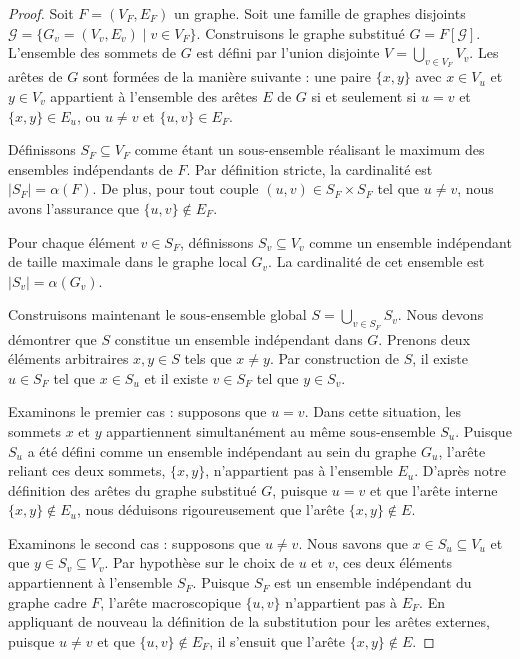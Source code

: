 \documentclass[11pt, a4paper]{article}
\begin{document}
\begin{proof}
Soit $F = (V_F, E_F)$ un graphe. Soit une famille de graphes disjoints $\mathcal{G} = \{G_v = (V_v, E_v) \mid v \in V_F\}$.
Construisons le graphe substitué $G = F[\mathcal{G}]$. L'ensemble des sommets de $G$ est défini par l'union disjointe $V = \bigcup_{v \in V_F} V_v$.
Les arêtes de $G$ sont formées de la manière suivante : une paire $\{x, y\}$ avec $x \in V_u$ et $y \in V_v$ appartient à l'ensemble des arêtes $E$ de $G$ si et seulement si $u = v$ et $\{x, y\} \in E_u$, ou $u \neq v$ et $\{u, v\} \in E_F$.

Définissons $S_F \subseteq V_F$ comme étant un sous-ensemble réalisant le maximum des ensembles indépendants de $F$.
Par définition stricte, la cardinalité est $|S_F| = \alpha(F)$. De plus, pour tout couple $(u, v) \in S_F \times S_F$ tel que $u \neq v$, nous avons l'assurance que $\{u, v\} \notin E_F$.

Pour chaque élément $v \in S_F$, définissons $S_v \subseteq V_v$ comme un ensemble indépendant de taille maximale dans le graphe local $G_v$.
La cardinalité de cet ensemble est $|S_v| = \alpha(G_v)$.

Construisons maintenant le sous-ensemble global $S = \bigcup_{v \in S_F} S_v$.
Nous devons démontrer que $S$ constitue un ensemble indépendant dans $G$.
Prenons deux éléments arbitraires $x, y \in S$ tels que $x \neq y$.
Par construction de $S$, il existe $u \in S_F$ tel que $x \in S_u$ et il existe $v \in S_F$ tel que $y \in S_v$.

Examinons le premier cas : supposons que $u = v$.
Dans cette situation, les sommets $x$ et $y$ appartiennent simultanément au même sous-ensemble $S_u$.
Puisque $S_u$ a été défini comme un ensemble indépendant au sein du graphe $G_u$, l'arête reliant ces deux sommets, $\{x, y\}$, n'appartient pas à l'ensemble $E_u$.
D'après notre définition des arêtes du graphe substitué $G$, puisque $u = v$ et que l'arête interne $\{x, y\} \notin E_u$, nous déduisons rigoureusement que l'arête $\{x, y\} \notin E$.

Examinons le second cas : supposons que $u \neq v$.
Nous savons que $x \in S_u \subseteq V_u$ et que $y \in S_v \subseteq V_v$.
Par hypothèse sur le choix de $u$ et $v$, ces deux éléments appartiennent à l'ensemble $S_F$.
Puisque $S_F$ est un ensemble indépendant du graphe cadre $F$, l'arête macroscopique $\{u, v\}$ n'appartient pas à $E_F$.
En appliquant de nouveau la définition de la substitution pour les arêtes externes, puisque $u \neq v$ et que $\{u, v\} \notin E_F$, il s'ensuit que l'arête $\{x, y\} \notin E$.


\end{proof}
\end{document}
